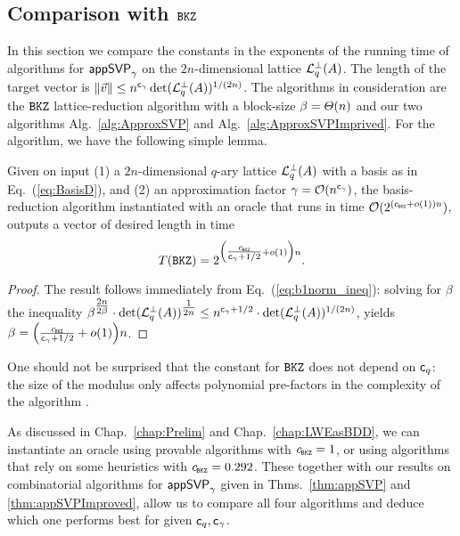 \subsection{Comparison with $\texttt{BKZ}$} \label{subsec:ComparisonWithBKZ}

In this section we compare the constants in the exponents of the running time of algorithms for $\textsf{appSVP}_{\gamma}$ on the $2n$-dimensional lattice $\mathcal{L}_q^{\perp}(A)$. The length of the target vector is $\|\vvec \| \leq n^{\cg} \det(\qLATTp(\AMat))^{1/(2n)}$. The algorithms in consideration are the $\texttt{BKZ}$ lattice-reduction algorithm with a block-size $\beta = \varTheta(n)$ and our two algorithms Alg.~\ref{alg:ApproxSVP} and Alg.~\ref{alg:ApproxSVPImprived}. For the \BKZ algorithm, we have the following simple lemma.

\begin{lemma} 
	Given on input (1) a $2n$-dimensional $q$-ary lattice $\mathcal{L}_q^{\perp}(A)$ with a basis as in Eq.~(\ref{eq:BasisD}), and (2) an approximation factor $\gamma = \mathcal{O}(n^{\mathsf{c}_{\gamma}})$, the \BKZ basis-reduction algorithm instantiated with an \SVP oracle that runs in time $\bigO(2^{(\cBKZ + \smallo(1))n})$, outputs a vector of desired length in time
	\[
		T(\BKZ) = 2^{\Big( \tfrac{\cBKZ }{\cg+1/2} + \smallo(1) \Big) n}.
	\]
\end{lemma}
\begin{proof}
	The result follows immediately from Eq.~(\ref{eq:b1norm_ineq}): solving for $\beta$ the inequality $\beta^{\tfrac{2n}{2\beta}} \cdot \det (\mathcal{L}_q^{\perp}(A))^{\tfrac{1}{2n}} \leq n^{\mathsf{c}_{\gamma}+1/2} \cdot \det (\mathcal{L}_q^{\perp}(A))^{1/(2n)}$, yields $\beta = \Big( \frac{\cBKZ}{\cg+1/2} + \smallo(1) \Big)n$.
\end{proof}

One should not be surprised that the constant for $\texttt{BKZ}$ does not depend on $\mathsf{c}_q$: the size of the modulus only affects polynomial pre-factors in the complexity of the algorithm \cite{C:HanPujSte11}.

As discussed in Chap.~\ref{chap:Prelim} and Chap.~\ref{chap:LWEasBDD}, we can instantiate an \SVP oracle using provable algorithms with $\cBKZ = 1$, or using algorithms that rely on some heuristics with $\cBKZ = 0.292$. These together with our results on combinatorial algorithms for $\textsf{appSVP}_{\gamma}$ given in Thms.~\ref{thm:appSVP} and \ref{thm:appSVPImproved}, allow us to compare all four algorithms and deduce which one performs best for given $\mathsf{c}_q, \mathsf{c}_{\gamma}$. 

%
%


